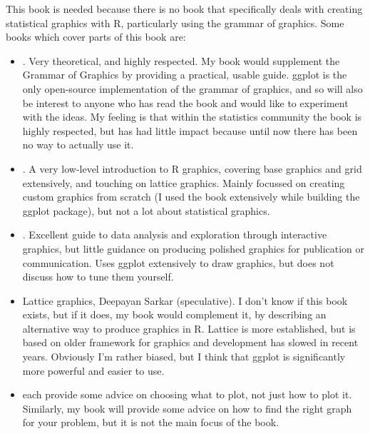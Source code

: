 \documentclass[oneside,letterpaper]{scrartcl}
\begin{document}

This book is needed because there is no book that specifically deals with creating statistical graphics with R, particularly using the grammar of graphics.  Some books which cover parts of this book are:

\begin{itemize}
  \item \citet{wilkinson:2006}.  Very theoretical, and highly respected.  My book would supplement the Grammar of Graphics by providing a practical, usable guide.  ggplot is the only open-source implementation of the grammar of graphics, and so will also be interest to anyone who has read the book and would like to experiment with the ideas.  My feeling is that within the statistics community the book is highly respected, but has had little impact because until now there has been no way to actually use it.
  
  \item \citet{murrell:2005}.  A very low-level introduction to R graphics, covering base graphics and grid extensively, and touching on lattice graphics.  Mainly focussed on creating custom graphics from scratch (I used the book extensively while building the ggplot package), but not a lot about statistical graphics.

  \item \citet{cook:2007}.  Excellent guide to data analysis and exploration through interactive graphics, but little guidance on producing polished graphics for publication or communication.  Uses ggplot extensively to draw graphics, but does not discuss how to tune them yourself.

  \item Lattice graphics, Deepayan Sarkar (speculative). I don't know if this book exists, but if it does, my book would complement it, by describing an alternative way to produce graphics in R.  Lattice is more established, but is based on older framework for graphics \citep{cleveland:1994} and development has slowed in recent years.  Obviously I'm rather biased, but I think that ggplot is significantly more powerful and easier to use.
  
  \item \citet{chambers:1983,cleveland:1993,cleveland:1994,robbins:2004} each provide some advice on choosing what to plot, not just how to plot it.  Similarly, my book will provide some advice on how to find the right graph for your problem, but it is not the main focus of the book. 
  
\end{itemize}
\end{document}
